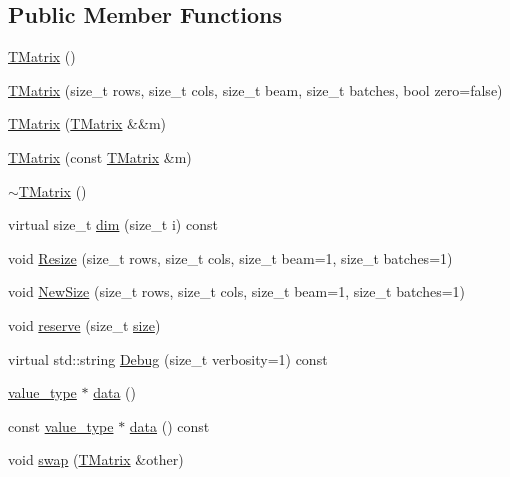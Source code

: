 \subsection*{Public Member Functions}
\begin{DoxyCompactItemize}
\item 
\hyperlink{classamunmt_1_1GPU_1_1mblas_1_1TMatrix_ae81300081f0705b32c36a04b33e9000c}{T\+Matrix} ()
\item 
\hyperlink{classamunmt_1_1GPU_1_1mblas_1_1TMatrix_a2bed15df51e1820a0dd900b111bfe222}{T\+Matrix} (size\+\_\+t rows, size\+\_\+t cols, size\+\_\+t beam, size\+\_\+t batches, bool zero=false)
\item 
\hyperlink{classamunmt_1_1GPU_1_1mblas_1_1TMatrix_a58b584dc9bee09d49e85b801ce7f880a}{T\+Matrix} (\hyperlink{classamunmt_1_1GPU_1_1mblas_1_1TMatrix}{T\+Matrix} \&\&m)
\item 
\hyperlink{classamunmt_1_1GPU_1_1mblas_1_1TMatrix_a5d0ced2a1cb7fbce39d018a571ef72de}{T\+Matrix} (const \hyperlink{classamunmt_1_1GPU_1_1mblas_1_1TMatrix}{T\+Matrix} \&m)
\item 
\hyperlink{classamunmt_1_1GPU_1_1mblas_1_1TMatrix_a5355566f8a8a7e804ab41cd2dcc3f306}{$\sim$\+T\+Matrix} ()
\item 
virtual size\+\_\+t \hyperlink{classamunmt_1_1GPU_1_1mblas_1_1TMatrix_a642b2578400a4e9d395212f888ff9b1a}{dim} (size\+\_\+t i) const 
\item 
void \hyperlink{classamunmt_1_1GPU_1_1mblas_1_1TMatrix_a080c2f2b4f5143726a957b0bd9fc201e}{Resize} (size\+\_\+t rows, size\+\_\+t cols, size\+\_\+t beam=1, size\+\_\+t batches=1)
\item 
void \hyperlink{classamunmt_1_1GPU_1_1mblas_1_1TMatrix_a379c5cc8ef7ca2f71da2d5055c9fb542}{New\+Size} (size\+\_\+t rows, size\+\_\+t cols, size\+\_\+t beam=1, size\+\_\+t batches=1)
\item 
void \hyperlink{classamunmt_1_1GPU_1_1mblas_1_1TMatrix_a71311ec900cc6cc35ac9605893a3f529}{reserve} (size\+\_\+t \hyperlink{classamunmt_1_1BaseMatrix_a52ccc5b9234726532fe0452a8aed5b1f}{size})
\item 
virtual std\+::string \hyperlink{classamunmt_1_1GPU_1_1mblas_1_1TMatrix_a2a1e6f455240cec3b8406cfef94128e5}{Debug} (size\+\_\+t verbosity=1) const 
\item 
\hyperlink{classamunmt_1_1GPU_1_1mblas_1_1TMatrix_afcab21668823619cd9578fea0cebd8df}{value\+\_\+type} $\ast$ \hyperlink{classamunmt_1_1GPU_1_1mblas_1_1TMatrix_ae8f1f47f7a414caad928ab99627f7084}{data} ()
\item 
const \hyperlink{classamunmt_1_1GPU_1_1mblas_1_1TMatrix_afcab21668823619cd9578fea0cebd8df}{value\+\_\+type} $\ast$ \hyperlink{classamunmt_1_1GPU_1_1mblas_1_1TMatrix_a6014fe64c3726d3133490697648ec0e5}{data} () const 
\item 
void \hyperlink{classamunmt_1_1GPU_1_1mblas_1_1TMatrix_a50ee1366bd54a911738974d06f4716fe}{swap} (\hyperlink{classamunmt_1_1GPU_1_1mblas_1_1TMatrix}{T\+Matrix} \&other)
\end{DoxyCompactItemize}
